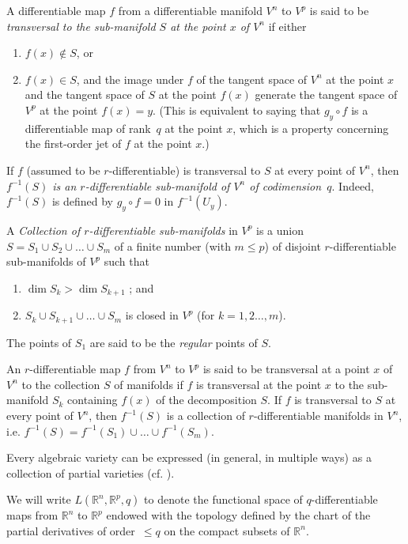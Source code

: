 \documentclass{article}
\theoremstyle{plain}
\theoremstyle{definition}
\newcommand{\RR}{\mathbb{R}}
\renewcommand{\leq}{\leqslant}
\begin{document}
A differentiable map $f$ from a differentiable manifold $V^n$ to $V^p$ is said to be \emph{transversal to the sub-manifold $S$ at the point $x$ of $V^n$} if either
\begin{enumerate}
  \item $f(x)\not\in S$, or
  \item $f(x)\in S$, and the image under $f$ of the tangent space of $V^n$ at the point $x$ and the tangent space of $S$ at the point $f(x)$ generate the tangent space of $V^p$ at the point $f(x)=y$.
    (This is equivalent to saying that $g_y\circ f$ is a differentiable map of rank~$q$ at the point $x$, which is a property concerning the first-order jet of $f$ at the point $x$.)
\end{enumerate}

If $f$ (assumed to be $r$-differentiable) is transversal to $S$ at every point of $V^n$, then \emph{$f^{-1}(S)$ is an $r$-differentiable sub-manifold of $V^n$ of codimension~$q$}.
Indeed, $f^{-1}(S)$ is defined by $g_y\circ f=0$ in $f^{-1}(U_y)$.

A \emph{Collection of $r$-differentiable sub-manifolds} in $V^p$ is a union $S=S_1\cup S_2\cup\ldots\cup S_m$ of a finite number (with $m\leq p$) of disjoint $r$-differentiable sub-manifolds of $V^p$ such that
\begin{enumerate}
  \item $\dim S_k>\dim S_{k+1}$ ; and
  \item $S_k\cup S_{k+1}\cup\ldots\cup S_m$ is closed in $V^p$ (for $k=1,2\ldots,m$).
\end{enumerate}
The points of $S_1$ are said to be the \emph{regular} points of $S$.

An $r$-differentiable map $f$ from $V^n$ to $V^p$ is said to be transversal at a point $x$ of $V^n$ to the collection $S$ of manifolds if $f$ is transversal at the point $x$ to the sub-manifold $S_k$ containing $f(x)$ of the decomposition $S$.
If $f$ is transversal to $S$ at every point of $V^n$, then $f^{-1}(S)$ is a collection of $r$-differentiable manifolds in $V^n$, i.e. $f^{-1}(S)=f^{-1}(S_1)\cup\ldots\cup f^{-1}(S_m)$.

Every algebraic variety can be expressed (in general, in multiple ways) as a collection of partial varieties (cf. \cite{8}).

We will write $L(\RR^n,\RR^p,q)$ to denote the functional space of $q$-differentiable maps from $\RR^n$ to $\RR^p$ endowed with the topology defined by the chart of the partial derivatives of order~$\leq q$ on the compact subsets of $\RR^n$.
\end{document}
